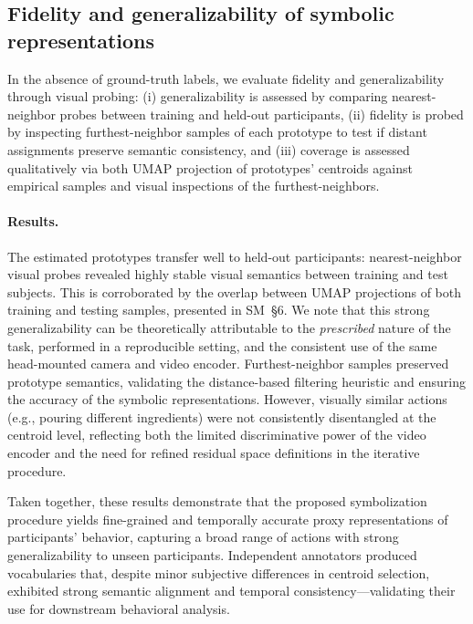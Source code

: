 \documentclass[runningheads]{llncs}
\begin{document}
    \subsection{Fidelity and generalizability of symbolic representations}

    In the absence of ground-truth labels, we evaluate fidelity and generalizability through visual probing: (i) generalizability is assessed by comparing nearest-neighbor probes between training and held-out participants, (ii) fidelity is probed by inspecting furthest-neighbor samples of each prototype to test if distant assignments preserve semantic consistency, and (iii) coverage is assessed qualitatively via both UMAP projection of prototypes' centroids against empirical samples and visual inspections of the furthest-neighbors.

    \paragraph{Results.} The estimated prototypes transfer well to held-out participants: nearest-neighbor visual probes revealed highly stable visual semantics between training and test subjects. This is corroborated by the overlap between UMAP projections of both training and testing samples, presented in SM~\S6. We note that this strong generalizability can be theoretically attributable to the \textit{prescribed} nature of the task, performed in a reproducible setting, and the consistent use of the same head-mounted camera and video encoder. Furthest-neighbor samples preserved prototype semantics, validating the distance-based filtering heuristic and ensuring the accuracy of the symbolic representations. However, visually similar actions (e.g., pouring different ingredients) were not consistently disentangled at the centroid level, reflecting both the limited discriminative power of the video encoder and the need for refined residual space definitions in the iterative procedure.


    Taken together, these results demonstrate that the proposed symbolization procedure yields fine-grained and temporally accurate proxy representations of participants' behavior, capturing a broad range of actions with strong generalizability to unseen participants. Independent annotators produced vocabularies that, despite minor subjective differences in centroid selection, exhibited strong semantic alignment and temporal consistency---validating their use for downstream behavioral analysis.
\end{document}
